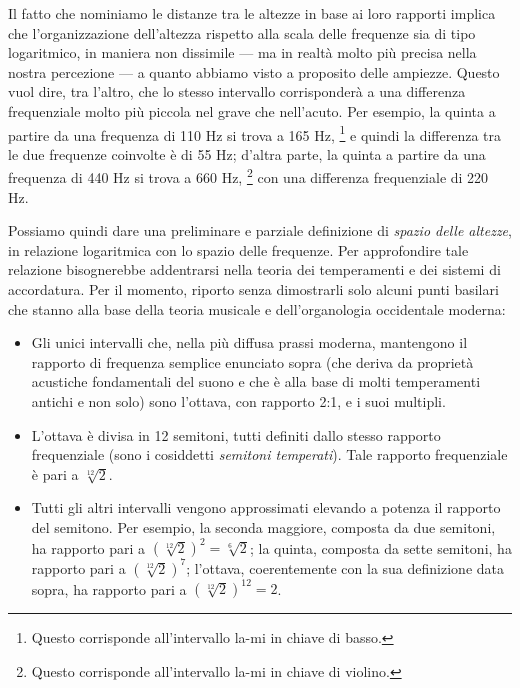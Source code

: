 Il fatto che nominiamo le distanze tra le altezze in base ai loro rapporti implica che l'organizzazione dell'altezza rispetto alla scala delle frequenze sia di tipo logaritmico, in maniera non dissimile --- ma in realtà molto più precisa nella nostra percezione --- a quanto abbiamo visto a proposito delle ampiezze. Questo vuol dire, tra l'altro, che lo stesso intervallo corrisponderà a una differenza frequenziale molto più piccola nel grave che nell'acuto. Per esempio, la quinta a partire da una frequenza di 110 Hz si trova a 165 Hz,%
\footnote{Questo corrisponde all'intervallo la-mi in chiave di basso.}
e quindi la differenza tra le due frequenze coinvolte è di 55 Hz; d'altra parte, la quinta a partire da una frequenza di 440 Hz si trova a 660 Hz,
\footnote{Questo corrisponde all'intervallo la-mi in chiave di violino.}
con una differenza frequenziale di 220 Hz.

Possiamo quindi dare una preliminare e parziale definizione di \emph{spazio delle altezze}, in relazione logaritmica con lo spazio delle frequenze. Per approfondire tale relazione bisognerebbe addentrarsi nella teoria dei temperamenti e dei sistemi di accordatura. Per il momento, riporto senza dimostrarli solo alcuni punti basilari che stanno alla base della teoria musicale e dell'organologia occidentale moderna:

\begin{itemize}

\item Gli unici intervalli che, nella più diffusa prassi moderna, mantengono il rapporto di frequenza semplice enunciato sopra (che deriva da proprietà acustiche fondamentali del suono e che è alla base di molti temperamenti antichi e non solo) sono l'ottava, con rapporto 2:1, e i suoi multipli.

\item L'ottava è divisa in 12 semitoni, tutti definiti dallo stesso rapporto frequenziale (sono i cosiddetti \emph{semitoni temperati}). Tale rapporto frequenziale è pari a $\sqrt[12]{2}$.

\item Tutti gli altri intervalli vengono approssimati elevando a potenza il rapporto del semitono. Per esempio, la seconda maggiore, composta da due semitoni, ha rapporto pari a $(\sqrt[12]{2})^2 = \sqrt[6]{2}$; la quinta, composta da sette semitoni, ha rapporto pari a $(\sqrt[12]{2})^7$; l'ottava, coerentemente con la sua definizione data sopra, ha rapporto pari a $(\sqrt[12]{2})^{12} = 2$.

\end{itemize}




